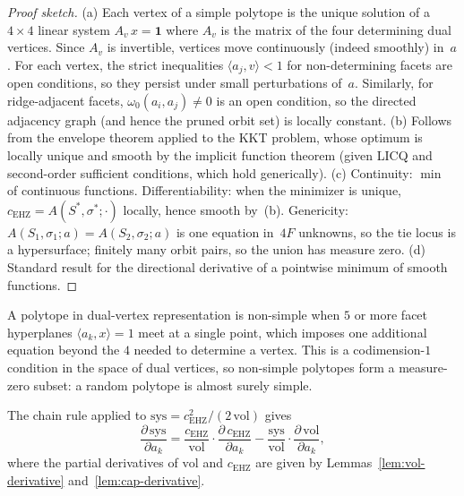 \begin{unverified}
\begin{proof}[Proof sketch]
(a) Each vertex of a simple polytope is the unique solution of a $4 \times 4$
linear system $A_v\,x = \mathbf{1}$ where $A_v$ is the matrix of the four
determining dual vertices. Since $A_v$ is invertible, vertices move
continuously (indeed smoothly) in~$a$.
For each vertex, the strict inequalities
$\langle a_j, v \rangle < 1$ for non-determining facets are open conditions, so they
persist under small perturbations of~$a$.
Similarly, for ridge-adjacent facets, $\omega_0(a_i, a_j) \neq 0$ is an open
condition, so the directed adjacency graph (and hence the pruned orbit set)
is locally constant.
(b) Follows from the envelope theorem applied to the KKT problem, whose
optimum is locally unique and smooth by the implicit function theorem
(given LICQ and second-order sufficient conditions, which hold generically).
(c) Continuity: $\min$ of continuous functions.
Differentiability: when the minimizer is unique, $c_{\mathrm{EHZ}} =
A(S^*,\sigma^*;\cdot)$ locally, hence smooth by~(b).
Genericity: $A(S_1,\sigma_1;a) = A(S_2,\sigma_2;a)$ is one equation in~$4F$
unknowns, so the tie locus is a hypersurface; finitely many orbit pairs, so
the union has measure zero.
(d) Standard result for the directional derivative of a pointwise minimum
of smooth functions.
\end{proof}
\end{unverified}

\begin{remark}
\label{rem:simplicity-generic}
A polytope in dual-vertex representation is non-simple when $5$ or more facet
hyperplanes $\langle a_k, x \rangle = 1$ meet at a single point, which
imposes one additional equation beyond the $4$ needed to determine a vertex.
This is a codimension-$1$ condition in the space of dual vertices, so non-simple
polytopes form a measure-zero subset: a random polytope is almost surely simple.
\end{remark}

\begin{unverified}
\begin{corollary}
\label{cor:sys-derivative}
The chain rule applied to
$\mathrm{sys} = c_{\mathrm{EHZ}}^2 / (2\,\mathrm{vol})$ gives
\[
  \frac{\partial\,\mathrm{sys}}{\partial a_k}
  = \frac{c_{\mathrm{EHZ}}}{\mathrm{vol}}
    \cdot \frac{\partial\,c_{\mathrm{EHZ}}}{\partial a_k}
  - \frac{\mathrm{sys}}{\mathrm{vol}}
    \cdot \frac{\partial\,\mathrm{vol}}{\partial a_k},
\]
where the partial derivatives of $\mathrm{vol}$ and $c_{\mathrm{EHZ}}$ are
given by Lemmas~\ref{lem:vol-derivative} and~\ref{lem:cap-derivative}.
\end{corollary}
\end{unverified}
